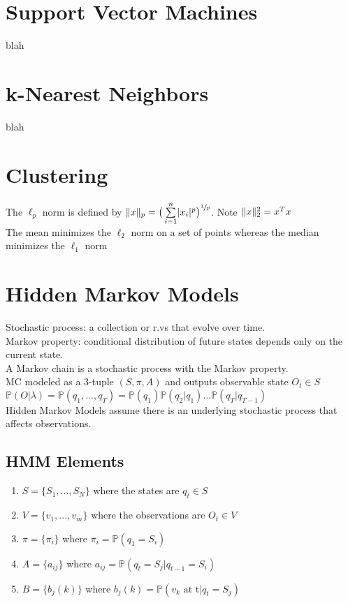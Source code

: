 \documentclass{article}
\renewcommand{\P}{\mathbb{P}}
\DeclarePairedDelimiter\abs{\lvert}{\rvert}
\DeclarePairedDelimiter\norm{\lVert}{\rVert}
\begin{document}
\section{Support Vector Machines}
blah

\section{k-Nearest Neighbors}
blah

\section{Clustering}
The $\ell_p$ norm is defined by $\norm{x}_p = \big(\sum\limits_{i=1}^n \abs{x_i}^p \big)^{\sfrac{1}{p}}$. Note $\norm{x}_2^2 = x^Tx$ \\
The mean minimizes the $\ell_2$ norm on a set of points whereas the median minimizes the $\ell_1$ norm 

\section{Hidden Markov Models}
Stochastic process: a collection or r.vs that evolve over time. \\
Markov property: conditional distribution of future states depends only on the current state. \\
A Markov chain is a stochastic process with the Markov property. \\
MC modeled as a 3-tuple $(S, \pi, A)$ and outputs observable state $O_t \in S$ \\
$\P(O | \lambda) = \P(q_1, ..., q_T) = \P(q_1)\P(q_2 | q_1)...\P(q_T | q_{T-1})$ \\
Hidden Markov Models assume there is an underlying stochastic process that affects observations.
\subsection{HMM Elements}
\begin{enumerate}
\item $S = \{S_1, ..., S_N\}$ where the states are $q_t \in S$ 
\item $V = \{v_1, ..., v_m\}$ where the observations are $O_t \in V$
\item $\pi = \{\pi_i\}$ where $\pi_i = \P(q_1 = S_i)$
\item $A = \{a_{ij}\}$ where $a_{ij} = \P(q_t = S_j | q_{t-1} = S_i)$
\item $B = \{b_j(k)\}$ where $b_j(k) = \P(v_k \mbox{ at t} | q_t = S_j)$
\end{enumerate}
\end{document}
